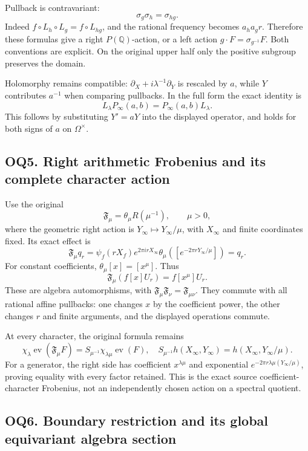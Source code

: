 Pullback is contravariant: \[
\sigma_g\sigma_h=\sigma_{hg}.
\tag{OQ4.4}
\] Indeed \(f\circ L_h\circ L_g=f\circ L_{hg}\), and the rational
frequency becomes \(a_ha_gr\). Therefore these formulas give a right
\(P(\mathbb Q)\)-action, or a left action \(g\cdot F=\sigma_{g^{-1}}F\).
Both conventions are explicit. On the original upper half only the
positive subgroup preserves the domain.

Holomorphy remains compatible: \(\partial_X+i\lambda^{-1}\partial_Y\) is
rescaled by \(a\), while \(Y\) contributes \(a^{-1}\) when comparing
pullbacks. In the full form the exact identity is \[
L_\lambda P_\infty(a,b)=P_\infty(a,b)L_\lambda.
\tag{OQ4.5}
\] This follows by substituting \(Y'=aY\) into the displayed operator,
and holds for both signs of \(a\) on \(\Omega^\times\).

\subsection{OQ5. Right arithmetic Frobenius and its complete character
action}\label{oq5.-right-arithmetic-frobenius-and-its-complete-character-action}

Use the original \[
\mathfrak F_\mu=\theta_\mu R(\mu^{-1}),\qquad\mu>0,
\] where the geometric right action is \(Y_\infty\mapsto Y_\infty/\mu\),
with \(X_\infty\) and finite coordinates fixed. Its exact effect is \[
\mathfrak F_\mu q_r
=\psi_f(rX_f)e^{2\pi irX_\infty}
\theta_\mu([e^{-2\pi rY_\infty/\mu}])
=q_r.
\tag{OQ5.1}
\] For constant coefficients, \(\theta_\mu[x]=[x^\mu]\). Thus \[
\boxed{\mathfrak F_\mu(f[x]U_r)=f[x^\mu]U_r.}
\tag{OQ5.2}
\] These are algebra automorphisms, with
\(\mathfrak F_\mu\mathfrak F_\nu=\mathfrak F_{\mu\nu}\). They commute
with all rational affine pullbacks: one changes \(x\) by the coefficient
power, the other changes \(r\) and finite arguments, and the displayed
operations commute.

At every character, the original formula remains \[
\chi_\lambda\operatorname{ev}(\mathfrak F_\mu F)
=S_{\mu^{-1}}\chi_{\lambda\mu}\operatorname{ev}(F),
\quad
S_{\mu^{-1}}h(X_\infty,Y_\infty)
=h(X_\infty,Y_\infty/\mu).
\tag{OQ5.3}
\] For a generator, the right side has coefficient \(x^{\lambda\mu}\)
and exponential \(e^{-2\pi r\lambda\mu(Y_\infty/\mu)}\), proving
equality with every factor retained. This is the exact source
coefficient-character Frobenius, not an independently chosen action on a
spectral quotient.

\subsection{OQ6. Boundary restriction and its global equivariant algebra
section}\label{oq6.-boundary-restriction-and-its-global-equivariant-algebra-section}

